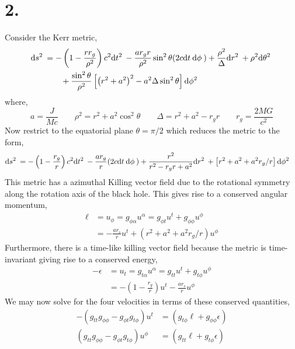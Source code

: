 \documentclass[12pt]{article}
\begin{document}
\section*{2.}

Consider the Kerr metric,
\begin{align*}
\mathrm{d}s^2 \: & = - \left( 1 - \frac{r r_g}{\rho^2} \right) c^2 \mathrm{d}t^2 \: - \frac{a r_g r}{\rho^2} \sin^2{\theta} (2 c \mathrm{d}t \: \mathrm{d}\phi \:) + \frac{\rho^2}{\Delta} \mathrm{d}r^2 \: + \rho^2 \mathrm{d}\theta^2 \:
\\
& \quad \quad + \frac{\sin^2{\theta}}{\rho^2} \left[ \left( r^2 + a^2 \right)^2 - a^2 \Delta \sin^2{\theta} \right] \mathrm{d}\phi^2 \: 
\end{align*}
where,
\[ a = \frac{J}{Mc} \quad \quad \rho^2 = r^2 + a^2 \cos^2{\theta} \quad \quad \Delta = r^2 + a^2 - r_g r \quad \quad r_g = \frac{2MG}{c^2} \]
Now restrict to the equatorial plane $\theta = \pi / 2$ which reduces the metric to the form,
\begin{align*}
\mathrm{d}s^2 \: & = - \left( 1 - \frac{r_g}{r} \right) c^2 \mathrm{d}t^2 \: - \frac{a r_g}{r}  (2  c \mathrm{d}t \: \mathrm{d}\phi \:) + \frac{r^2}{r^2 - r_g r + a^2} \mathrm{d}r^2 \: 
 +  \left[r^2 + a^2 + a^2 r_g / r \right] \mathrm{d}\phi^2 \: 
\end{align*}
This metric has a azimuthal Killing vector field due to the rotational symmetry along the rotation axis of the black hole. This gives rise to a conserved angular momentum,
\begin{align*}
\ell & = u_\phi = g_{\phi \alpha} u^\alpha = g_{\phi t} u^t + g_{\phi \phi} u^\phi
\\
& = - \frac{a r_s}{r} u^t + (r^2 + a^2 + a^2 r_g / r) u^\phi 
\end{align*} 
Furthermore, there is a time-like killing vector field because the metric is time-invariant giving rise to a conserved energy,
\begin{align*}
- \epsilon & = u_t = g_{t \alpha} u^\alpha = g_{tt} u^t + g_{t \phi} u^\phi
\\
& = - \left( 1 - \frac{r_g}{r} \right) u^t - \frac{ar_s}{r} u^\phi
\end{align*}
We may now solve for the four velocities in terms of these conserved quantities,
\begin{align*}
-\left( g_{tt} g_{\phi \phi} - g_{\phi t} g_{t \phi} \right) u^t & = \left( g_{t \phi} \ell + g_{\phi \phi} \epsilon \right)
\\
\left( g_{tt} g_{\phi \phi} - g_{\phi t} g_{t \phi} \right) u^\phi  & = \left( g_{t t} \ell + g_{t \phi} \epsilon \right)
\end{align*}
\end{document}

